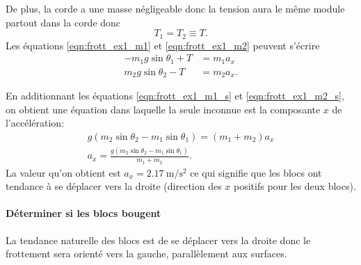De plus, la corde a une masse négligeable donc la tension aura le même module
partout dans la corde donc
\[
  T_1 = T_2 \equiv T.
\]
Les équations \ref{eqn:frott_ex1_m1} et \ref{eqn:frott_ex1_m2} peuvent s'écrire
\begin{align}
  -m_1g \sin\theta_1 + T &= m_1a_{x}  \label{eqn:frott_ex1_m1_s} \\
  m_2g \sin\theta_2 - T &= m_2a_{x}.  \label{eqn:frott_ex1_m2_s}
\end{align}

En additionnant les équations \ref{eqn:frott_ex1_m1_s} et
\ref{eqn:frott_ex1_m2_s},
on obtient une équation dans laquelle la seule inconnue est la composante $x$
de l'accélération:
\begin{align*}
  g(m_2\sin\theta_2 - m_1 \sin\theta_1) = (m_1 + m_2) a_x \\
  a_x = \frac{g(m_2\sin\theta_2 - m_1 \sin\theta_1)}{m_1 + m_2}.
\end{align*}
La valeur qu'on obtient est $a_x = \SI{2.17}{\meter\per\second\squared}$ ce qui
signifie que les blocs ont tendance à se déplacer vers la droite (direction des
$x$ positifs pour les deux blocs).

\paragraph{Déterminer si les blocs bougent}

La tendance naturelle des blocs est de se déplacer vers la droite donc le
frottement sera orienté vers la gauche, parallèlement aux surfaces.

